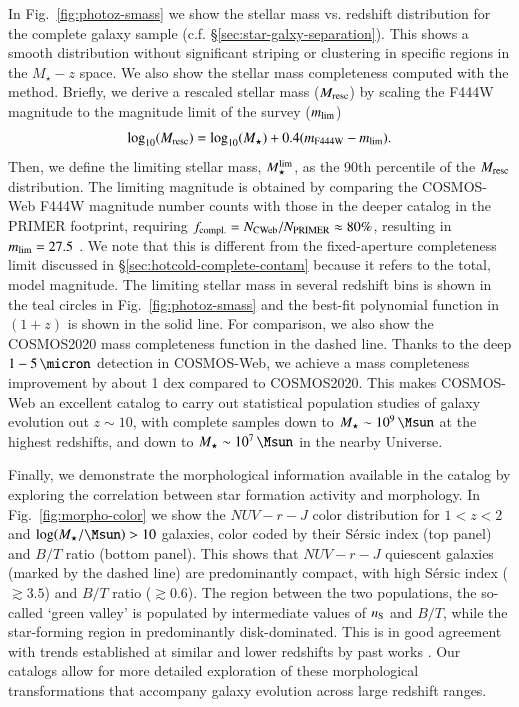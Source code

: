 \documentclass[longauth]{aa}
\begin{document}
In Fig.~\ref{fig:photoz-smass} we show the stellar mass vs. redshift distribution for the complete galaxy sample (c.f. \S \ref{sec:star-galxy-separation}). This shows a smooth distribution without significant striping or clustering in specific regions in the $M_{\star}-z$ space. We also show the stellar mass completeness computed with the \cite{pozzetti_zcosmos_2010} method. Briefly, we derive a rescaled stellar mass ($M_{\rm resc}$) by scaling the F444W magnitude to the magnitude limit of the survey ($m_{\rm lim}$)
\begin{equation} \label{eq:mass-completeness}
    \text{log}_{10}(M_{\text{resc}}) = \text{log}_{10} (M_{\star}) + 0.4 ( m_{\text{F444W}} - m_{\rm lim} ).
\end{equation}
Then, we define the limiting stellar mass, $M_{\star}^{\rm lim}$, as the 90th percentile of the $M_{\rm resc}$ distribution. The limiting magnitude is obtained by comparing the COSMOS-Web F444W magnitude number counts with those in the deeper catalog in the PRIMER footprint, requiring $f_{\rm compl.} = N_{\rm CWeb}/N_{\rm PRIMER} \approx 80\%$, resulting in $m_{\rm lim} = 27.5$ \citep{Shuntov2024}. We note that this is different from the fixed-aperture completeness limit discussed in \S\ref{sec:hotcold-complete-contam} because it refers to the total, model magnitude. The limiting stellar mass in several redshift bins is shown in the teal circles in Fig.~\ref{fig:photoz-smass} and the best-fit polynomial function in $(1+z)$ is shown in the solid line. For comparison, we also show the COSMOS2020 mass completeness function in the dashed line. Thanks to the deep $1-5 \, \si{\micron}$ detection in COSMOS-Web, we achieve a mass completeness improvement by about 1 dex compared to COSMOS2020. This makes COSMOS-Web an excellent catalog to carry out statistical population studies of galaxy evolution out $z\sim10$, with complete samples down to $M_{\star}\sim10^{9} \, \si{\Msun}$ at the highest redshifts, and down to $M_{\star}\sim10^{7} \, \si{\Msun}$ in the nearby Universe.


Finally, we demonstrate the morphological information available in the catalog by exploring the correlation between star formation activity and morphology. In Fig.~\ref{fig:morpho-color} we show the $NUV-r-J$ color distribution for $1<z<2$ and $\log(M_{\star}/\si{\Msun})>10$ galaxies, color coded by their Sérsic index (top panel) and $B/T$ ratio (bottom panel). This shows that $NUV-r-J$ quiescent galaxies (marked by the dashed line) are predominantly compact, with high Sérsic index ($\gtrsim 3.5$) and $B/T$ ratio ($\gtrsim 0.6$). The region between the two populations, the so-called `green valley' is populated by intermediate values of $n_{\rm S}$ and $B/T$, while the star-forming region in predominantly disk-dominated. This is in good agreement with trends established at similar and lower redshifts by past works \citep[e.g.,][]{Daddi2005, Trujillo2007, Barro2013, Barro2017, 2016A&A...589A..35S}. Our catalogs allow for more detailed exploration of these morphological transformations that accompany galaxy evolution across large redshift ranges.
\end{document}
